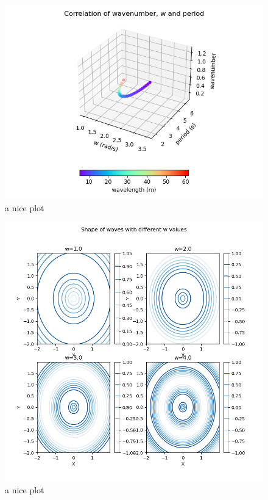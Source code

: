 \documentclass{article}
\begin{document}
\begin{figure}[h]
    \centering
    \includegraphics[width=1\textwidth]{img/2_1_correlation.png}
    \caption{a nice plot}
    \label{fig:plt2}
\end{figure}

\begin{figure}[h]
    \centering
    \includegraphics[width=1\textwidth]{img/2_2_waveshape.png}
    \caption{a nice plot}
    \label{fig:plt3}
\end{figure}
\end{document}
